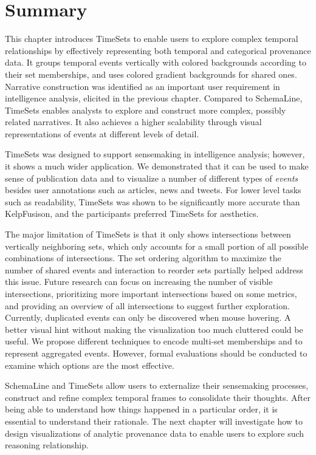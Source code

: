 \section{Summary}
This chapter introduces TimeSets to enable users to explore complex temporal relationships by effectively representing both temporal and categorical provenance data. It groups temporal events vertically with colored backgrounds according to their set memberships, and uses colored gradient backgrounds for shared ones. Narrative construction was identified as an important user requirement in intelligence analysis, elicited in the previous chapter. Compared to SchemaLine, TimeSets enables analysts to explore and construct more complex, possibly related narratives. It also achieves a higher scalability through visual representations of events at different levels of detail.

TimeSets was designed to support sensemaking in intelligence analysis; however, it shows a much wider application. We demonstrated that it can be used to make sense of publication data and to visualize a number of different types of \emph{events} besides user annotations such as articles, news and tweets. For lower level tasks such as readability, TimeSets was shown to be significantly more accurate than KelpFusison, and the participants preferred TimeSets for aesthetics.

The major limitation of TimeSets is that it only shows intersections between vertically neighboring sets, which only accounts for a small portion of all possible combinations of intersections. The set ordering algorithm to maximize the number of shared events and interaction to reorder sets partially helped address this issue. Future research can focus on increasing the number of visible intersections, prioritizing more important intersections based on some metrics, and providing an overview of all intersections to suggest further exploration. Currently, duplicated events can only be discovered when mouse hovering. A better visual hint without making the visualization too much cluttered could be useful. We propose different techniques to encode multi-set memberships and to represent aggregated events. However, formal evaluations should be conducted to examine which options are the most effective.

SchemaLine and TimeSets allow users to externalize their sensemaking processes, construct and refine complex temporal frames to consolidate their thoughts. After being able to understand how things happened in a particular order, it is essential to understand their rationale. The next chapter will investigate how to design visualizations of analytic provenance data to enable users to explore such reasoning relationship.

